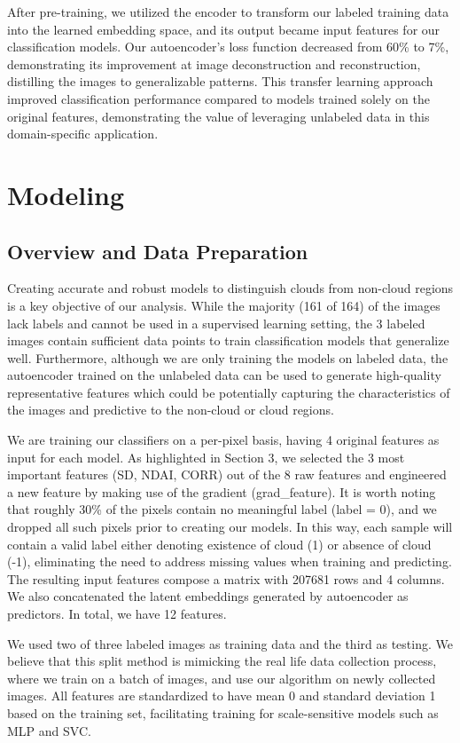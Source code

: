 \documentclass[10pt,letterpaper]{article}
\begin{document}
After pre-training, we utilized the encoder to transform our labeled training data into the learned embedding space, and its output became input features for our classification models. Our autoencoder's loss function decreased from 60\% to 7\%, demonstrating its improvement at image deconstruction and reconstruction, distilling the images to generalizable patterns. This transfer learning approach improved classification performance compared to models trained solely on the original features, demonstrating the value of leveraging unlabeled data in this domain-specific application.


\section{Modeling}
\subsection{Overview and Data Preparation}
Creating accurate and robust models to distinguish clouds from non-cloud regions is a key objective of our analysis. While the majority (161 of 164) of the images lack labels and cannot be used in a supervised learning setting, the 3 labeled images contain sufficient data points to train classification models that generalize well. Furthermore, although we are only training the models on labeled data, the autoencoder trained on the unlabeled data can be used to generate high-quality representative features which could be potentially capturing the characteristics of the images and predictive to the non-cloud or cloud regions.

We are training our classifiers on a per-pixel basis, having 4 original features as input for each model. As highlighted in Section 3, we selected the 3 most important features (SD, NDAI, CORR) out of the 8 raw features and engineered a new feature by making use of the gradient (grad\_feature). It is worth noting that roughly 30\% of the pixels contain no meaningful label (label = 0), and we dropped all such pixels prior to creating our models. In this way, each sample will contain a valid label either denoting existence of cloud (1) or absence of cloud (-1), eliminating the need to address missing values when training and predicting. The resulting input features compose a matrix with 207681 rows and 4 columns. We also concatenated the latent embeddings generated by autoencoder as predictors. In total, we have 12 features.


We used two of three labeled images as training data and the third as testing. We believe that this split method is mimicking the real life data collection process, where we train on a batch of images, and use our algorithm on newly collected images. All features are standardized to have mean 0 and standard deviation 1 based on the training set, facilitating training for scale-sensitive models such as MLP and SVC.
\end{document}
